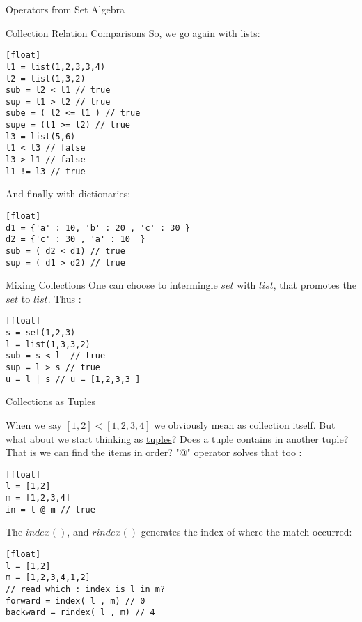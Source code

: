 \begin{section}{Operators from Set Algebra}
\begin{subsection}{Collection Relation Comparisons}
So, we go again with lists:

\begin{lstlisting}[style=JexlStyle][float]
l1 = list(1,2,3,3,4)
l2 = list(1,3,2)
sub = l2 < l1 // true  
sup = l1 > l2 // true 
sube = ( l2 <= l1 ) // true  
supe = (l1 >= l2) // true 
l3 = list(5,6)
l1 < l3 // false 
l3 > l1 // false 
l1 != l3 // true
\end{lstlisting}

And finally with dictionaries:

\begin{lstlisting}[style=JexlStyle][float]
d1 = {'a' : 10, 'b' : 20 , 'c' : 30 }
d2 = {'c' : 30 , 'a' : 10  }
sub = ( d2 < d1) // true 
sup = ( d1 > d2) // true
\end{lstlisting}
\end{subsection}

\begin{subsection}{Mixing Collections}
One can choose to intermingle $set$ with $list$, that promotes the $set$ to $list$.
Thus :

\begin{lstlisting}[style=JexlStyle][float]
s = set(1,2,3)
l = list(1,3,3,2)
sub = s < l  // true  
sup = l > s // true 
u = l | s // u = [1,2,3,3 ]
\end{lstlisting}

\end{subsection}


\begin{subsection}{Collections as Tuples}

When we say $[1,2] < [1,2,3,4] $ we obviously mean as collection itself.
But what about we start thinking as \href{https://en.wikipedia.org/wiki/Tuple}{tuples}?
Does a tuple contains in another tuple? That is we can find the items in order? 
"@" operator solves that too :

\begin{lstlisting}[style=JexlStyle][float]
l = [1,2]
m = [1,2,3,4]
in = l @ m // true 
\end{lstlisting}

The $index()$, and $rindex()$ generates the index of where the match occurred:

\begin{lstlisting}[style=JexlStyle][float]
l = [1,2]
m = [1,2,3,4,1,2]
// read which : index is l in m?
forward = index( l , m) // 0 
backward = rindex( l , m) // 4   
\end{lstlisting}


\end{subsection}
\end{section}
